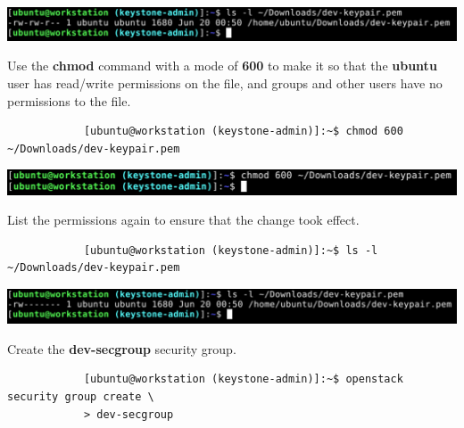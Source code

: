 \documentclass[letterpaper, 12pt]{article}
\begin{document}
\begin{enumerate}
\begin{labstep}
        \begin{center}
            \includegraphics[width=\linewidth]{images/part1/step23.png}
        \end{center}
    \end{labstep}

    \begin{labstep}
        Use the \textbf{chmod} command with a mode of \textbf{600} to make it so that the \textbf{ubuntu} user has read/write permissions on the file, and groups and other users have no permissions to the file.
        \begin{lstlisting}
            [ubuntu@workstation (keystone-admin)]:~$ chmod 600 ~/Downloads/dev-keypair.pem
        \end{lstlisting}

        \begin{center}
            \includegraphics[width=\linewidth]{images/part1/step24.png}
        \end{center}
    \end{labstep}

    \begin{labstep}
        List the permissions again to ensure that the change took effect.
        \begin{lstlisting}
            [ubuntu@workstation (keystone-admin)]:~$ ls -l ~/Downloads/dev-keypair.pem
        \end{lstlisting}

        \begin{center}
            \includegraphics[width=\linewidth]{images/part1/step25.png}
        \end{center}
    \end{labstep}

    \begin{labstep}
        Create the \textbf{dev-secgroup} security group.
        \begin{lstlisting}
            [ubuntu@workstation (keystone-admin)]:~$ openstack security group create \
            > dev-secgroup
        \end{lstlisting}


\end{labstep}
\end{enumerate}
\end{document}
